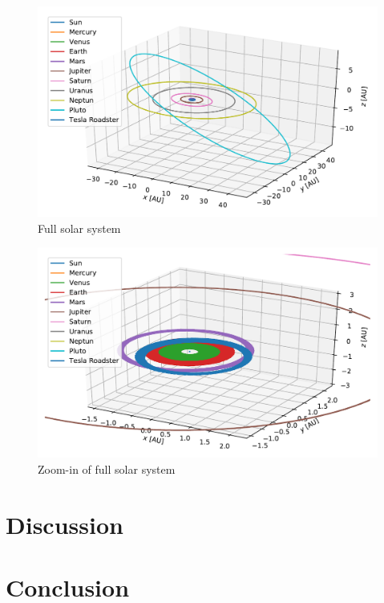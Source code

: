 \documentclass[twocolumn]{aastex62}
\begin{document}
\begin{figure}
\includegraphics[scale=1]{Figures/OuterSolarSystem.pdf}
\caption{Full solar system}
\label{fig:inner}
\end{figure}

\begin{figure}
\includegraphics[scale=1]{Figures/InnerSolarSystem.pdf}
\caption{Zoom-in of full solar system}
\label{fig:outer}
\end{figure}

\section{Discussion} \label{sec:discussion}

\section{Conclusion} \label{sec:conclusion}

\nocite{jensen:2019}
\newpage


\end{document}
